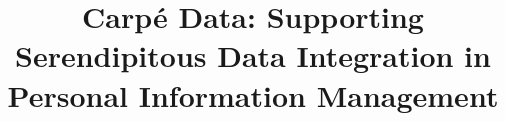 \documentclass{sigchi}
\begin{document}
\title{Carp\'{e} Data: Supporting Serendipitous Data Integration in Personal Information Management}



\maketitle
\end{document}
